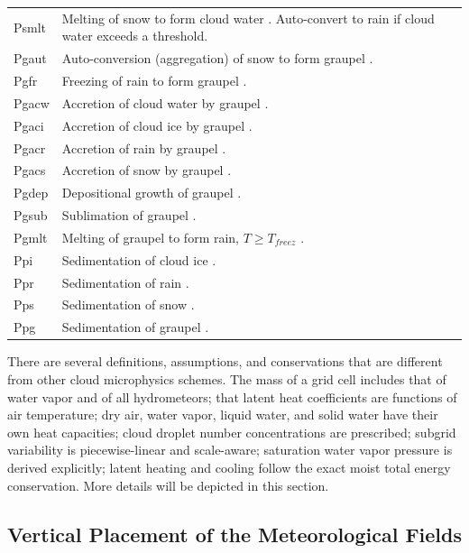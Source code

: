 \documentclass[letterpaper,titlepage,10pt]{article}
\numberwithin{equation}{section}
\begin{document}
\begin{table}[!h]
\begin{tabular}{p{}p{}}
Psmlt	&	Melting of snow to form cloud water \citep{lin1983bulk}. Auto-convert to rain if cloud water exceeds a threshold.	\\
Pgaut	&	Auto-conversion (aggregation) of snow to form graupel \citep{lin1983bulk}.	\\
Pgfr	&	Freezing of rain to form graupel \citep{lin1983bulk}.	\\
Pgacw	&	Accretion of cloud water by graupel \citep{lin1983bulk}.	\\
Pgaci	&	Accretion of cloud ice by graupel \citep{lin1983bulk}.	\\
Pgacr	&	Accretion of rain by graupel \citep{lin1983bulk}.	\\
Pgacs	&	Accretion of snow by graupel \citep{lin1983bulk}.	\\
Pgdep	&	Depositional growth of graupel \citep{lin1983bulk}.	\\
Pgsub	&	Sublimation of graupel \citep{lin1983bulk}.	\\
Pgmlt	&	Melting of graupel to form rain, $T \geq T_{freez}$ \citep{lin1983bulk}.	\\
Ppi		&	Sedimentation of cloud ice \citep{deng2008cirr, heymsfield1990asch}.	\\
Ppr		&	Sedimentation of rain \citep{lin1983bulk}.	\\
Pps		&	Sedimentation of snow \citep{lin1983bulk}.	\\
Ppg		&	Sedimentation of graupel \citep{lin1983bulk}.	\\
\hline
\end{tabular}
\end{table}

There are several definitions, assumptions, and conservations that are different from other cloud microphysics schemes. The mass of a grid cell includes that of water vapor and of all hydrometeors; that latent heat coefficients are functions of air temperature; dry air, water vapor, liquid water, and solid water have their own heat capacities; cloud droplet number concentrations are prescribed; subgrid variability is piecewise-linear and scale-aware; saturation water vapor pressure is derived explicitly; latent heating and cooling follow the exact moist total energy conservation. More details will be depicted in this section.


\subsection{Vertical Placement of the Meteorological Fields}
\end{document}

